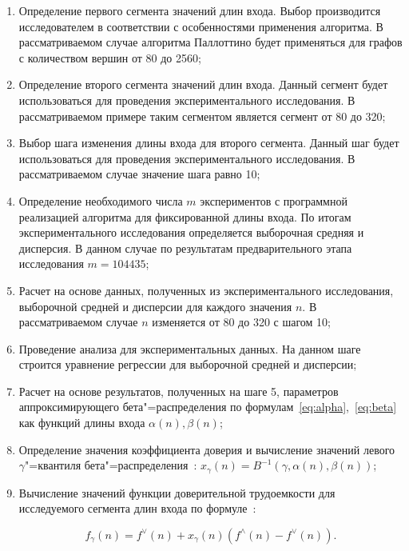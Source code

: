 \documentclass[a4paper, article, 14pt]{extarticle}
\begin{document}
\begin{enumerate}
	\item Определение первого сегмента значений длин входа. Выбор производится исследователем в соответствии с особенностями применения алгоритма. В рассматриваемом случае алгоритма Паллоттино будет применяться для графов с количеством вершин от 80 до 2560;

	\item Определение второго сегмента значений длин входа. Данный сегмент будет использоваться для проведения экспериментального исследования. В рассматриваемом примере таким сегментом является сегмент от 80 до 320;

	\item Выбор шага изменения длины входа для второго сегмента. Данный шаг будет использоваться для проведения экспериментального исследования. В рассматриваемом случае значение шага равно 10;

	\item Определение необходимого числа $m$ экспериментов с программной реализацией алгоритма для фиксированной длины входа. По итогам экспериментального исследования определяется выборочная средняя и дисперсия. В данном случае по результатам предварительного этапа исследования $m = 104435$;

	\item Расчет на основе данных, полученных из экспериментального исследования, выборочной средней и дисперсии для каждого значения $n$. В рассматриваемом случае $n$ изменяется от 80 до 320 с шагом 10;

	\item Проведение анализа для экспериментальных данных. На данном шаге строится уравнение регрессии для выборочной средней и дисперсии;

	\item Расчет на основе результатов, полученных на шаге 5, параметров аппроксимирующего бета"=распределения по формулам~\eqref{eq:alpha},~\eqref{eq:beta} как функций длины входа $\alpha(n), \beta(n)$;

	\item Определение значения коэффициента доверия и вычисление значений левого $\gamma$"=квантиля бета"=распределения~\cite{petrushyn_ulyanov_definitions}: $x_\gamma(n) = B^{-1}(\gamma, \alpha(n), \beta(n))$;

	\item Вычисление значений функции доверительной трудоемкости для исследуемого сегмента длин входа по формуле~\cite{petrushyn_ulyanov_analysis}:

	\begin{equation}\label{eq:final_complexity_fucntion}
		f_\gamma(n) = f^\vee(n) + x_\gamma(n) (f^\wedge(n) - f^\vee(n)).
	\end{equation}
\end{enumerate}
\end{document}
